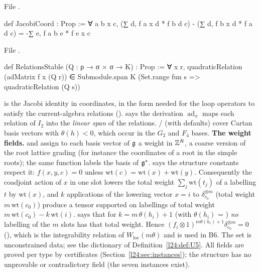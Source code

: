 \noindent File .
\begin{leancode}
def JacobiCoord : Prop :=
  ∀ a b x c, (∑ d, f a x d * f b d c) - (∑ d, f b x d * f a d c) = -∑ e, f a b e * f e x c
\end{leancode}
\noindent File .
\begin{leancode}
def RelationsStable (Q : ρ → σ × σ → K) : Prop :=
  ∀ x r, quadraticRelation (adMatrix f x (Q r)) ∈
    Submodule.span K (Set.range fun s => quadraticRelation (Q s))
\end{leancode}

\begin{dictionary}
 is the Jacobi identity in coordinates, in the form needed for the loop operators to satisfy
the current-algebra relations ().  says the derivation $\operatorname{ad}_x$
maps each relation of $I_2$ into the \emph{linear span} of the relations. / (with
defaults) cover Cartan basis vectors with $\theta(h)<0$, which occur in the $G_2$ and $F_4$ bases.
\textbf{The weight fields.}  and  assign to each basis vector of $\mathfrak g$ a weight in
${\mathbb{Z}}^R$, a coarse version of the root lattice grading (for instance the coordinates of a root in the simple roots); the
same function labels the basis of $\mathfrak g^*$.  says the structure constants respect it:
$f(x,y,c)=0$ unless $\mathrm{wt}(c)=\mathrm{wt}(x)+\mathrm{wt}(y)$. Consequently the coadjoint action of $x$ in one slot
lowers the total weight $\sum_j\mathrm{wt}(t_j)$ of a labelling $t$ by $\mathrm{wt}(x)$, and $k$ applications of the
lowering vector $x=i$ to $\delta_{c_0}^{\otimes m}$ (total weight $m\,\mathrm{wt}(c_0)$) produce a tensor supported on labellings of
total weight $m\,\mathrm{wt}(c_0)-k\,\mathrm{wt}(i)$.  says that for $k=m\,\theta(h_i)+1$ (with
$\theta(h_i)$ = ) \emph{no} labelling of the $m$ slots has that total weight. Hence
$(f_i\otimes1)^{m\theta(h_i)+1}\delta_{c_0}^{\otimes m}=0$ (), which is the integrability relation of
$W_{\mathrm{loc}}(m\theta)$ and is used in B6. The  set is unconstrained data; see the dictionary of
Definition~\ref{l24:def:U5}. All fields are proved per type by certificates (Section~\ref{l24:sec:instances}); the
structure has no unprovable or contradictory field (the seven instances exist).
\end{dictionary}


